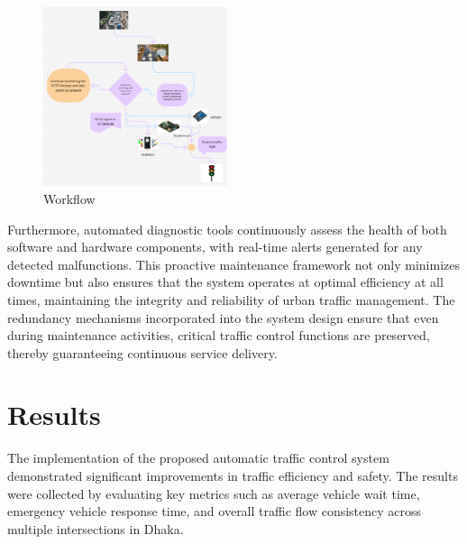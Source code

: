 \documentclass[usenatbib]{tjaa}
\begin{document}
\begin{figure}
    \centering
    \includegraphics[width=0.48\textwidth]{6_.png}
    \caption{Workflow}
    \label{fig:wrap1}
\end{figure}



Furthermore, automated diagnostic tools continuously assess the health of both software and hardware components, with real-time alerts generated for any detected malfunctions. This proactive maintenance framework not only minimizes downtime but also ensures that the system operates at optimal efficiency at all times, maintaining the integrity and reliability of urban traffic management. The redundancy mechanisms incorporated into the system design ensure that even during maintenance activities, critical traffic control functions are preserved, thereby guaranteeing continuous service delivery.



\section{Results}
The implementation of the proposed automatic traffic control system demonstrated significant improvements in traffic efficiency and safety. The results were collected by evaluating key metrics such as average vehicle wait time, emergency vehicle response time, and overall traffic flow consistency across multiple intersections in Dhaka.
\end{document}
